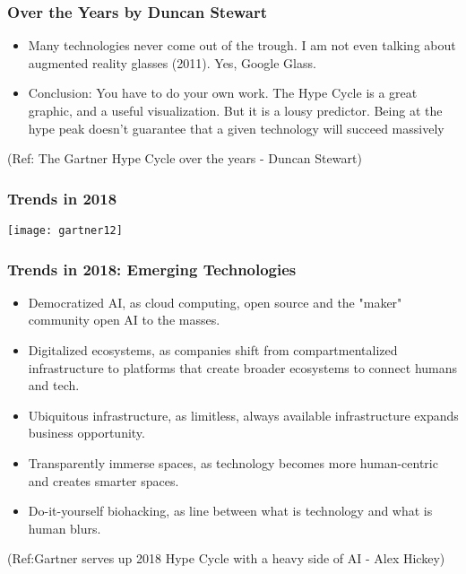 \begin{frame}[fragile]\frametitle{Over the Years by Duncan Stewart}


\begin{itemize}
\item Many technologies never come out of the trough. I am not even talking about augmented reality glasses (2011). Yes, Google Glass.

\item Conclusion: You have to do your own work. The Hype Cycle is a great graphic, and a useful visualization. But it is a lousy predictor. Being at the hype peak doesn’t guarantee that a given technology will succeed massively
\end{itemize}

{\tiny (Ref: The Gartner Hype Cycle over the years - Duncan Stewart)}


\end{frame}

\begin{frame}[fragile]\frametitle{Trends in 2018}

\begin{center}
\texttt{[image: gartner12]}
\end{center}


\end{frame}

\begin{frame}[fragile]\frametitle{Trends in 2018: Emerging Technologies}
\begin{itemize}
\item Democratized AI, as cloud computing, open source and the "maker" community open AI to the masses.

\item Digitalized ecosystems, as companies shift from compartmentalized infrastructure to platforms that create broader ecosystems to connect humans and tech.

\item Ubiquitous infrastructure, as limitless, always available infrastructure expands business opportunity.

\item Transparently immerse spaces, as technology becomes more human-centric and creates smarter spaces.

\item Do-it-yourself biohacking, as line between what is technology and what is human blurs.

\end{itemize}


{\tiny (Ref:Gartner serves up 2018 Hype Cycle with a heavy side of AI - Alex Hickey)}

\end{frame}

